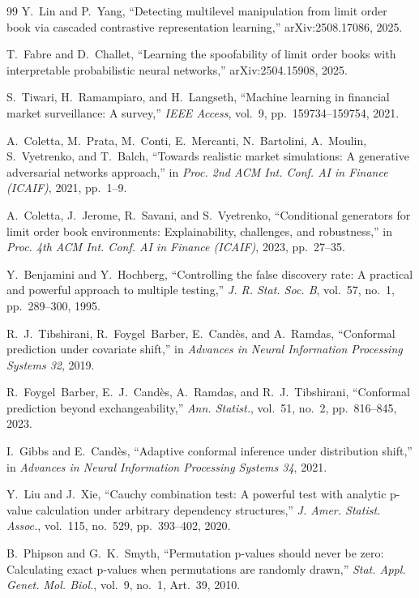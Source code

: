 \documentclass[journal]{IEEEtran}
\begin{document}
\begin{thebibliography}{99}
 Y.~Lin and P.~Yang, ``Detecting multilevel manipulation from limit order book via
cascaded contrastive representation learning,'' arXiv:2508.17086, 2025.

 T.~Fabre and D.~Challet, ``Learning the spoofability of limit order books with
interpretable probabilistic neural networks,'' arXiv:2504.15908, 2025.

 S.~Tiwari, H.~Ramampiaro, and H.~Langseth, ``Machine learning in financial market
surveillance: A survey,'' \emph{IEEE Access}, vol.~9, pp.~159734--159754, 2021.

 A.~Coletta, M.~Prata, M.~Conti, E.~Mercanti, N.~Bartolini, A.~Moulin, S.~Vyetrenko,
and T.~Balch, ``Towards realistic market simulations: A generative adversarial networks approach,'' in
\emph{Proc. 2nd ACM Int. Conf. AI in Finance (ICAIF)}, 2021, pp.~1--9.

 A.~Coletta, J.~Jerome, R.~Savani, and S.~Vyetrenko, ``Conditional generators for
limit order book environments: Explainability, challenges, and robustness,'' in \emph{Proc. 4th ACM Int. Conf.
AI in Finance (ICAIF)}, 2023, pp.~27--35.

 Y.~Benjamini and Y.~Hochberg, ``Controlling the false discovery rate: A
practical and powerful approach to multiple testing,'' \emph{J. R. Stat. Soc. B}, vol.~57, no.~1, pp.~289--300,
1995.

 R.~J.~Tibshirani, R.~Foygel~Barber, E.~Cand\`es, and A.~Ramdas, ``Conformal
prediction under covariate shift,'' in \emph{Advances in Neural Information Processing Systems 32}, 2019.

 R.~Foygel~Barber, E.~J.~Cand\`es, A.~Ramdas, and R.~J.~Tibshirani, ``Conformal
prediction beyond exchangeability,'' \emph{Ann. Statist.}, vol.~51, no.~2, pp.~816--845, 2023.

 I.~Gibbs and E.~Cand\`es, ``Adaptive conformal inference under distribution shift,''
in \emph{Advances in Neural Information Processing Systems 34}, 2021.

 Y.~Liu and J.~Xie, ``Cauchy combination test: A powerful test with analytic p-value
calculation under arbitrary dependency structures,'' \emph{J. Amer. Statist. Assoc.}, vol.~115, no.~529,
pp.~393--402, 2020.

 B.~Phipson and G.~K.~Smyth, ``Permutation p-values should never be zero:
Calculating exact p-values when permutations are randomly drawn,'' \emph{Stat. Appl. Genet. Mol. Biol.},
vol.~9, no.~1, Art.~39, 2010.

\end{thebibliography}
\end{document}
